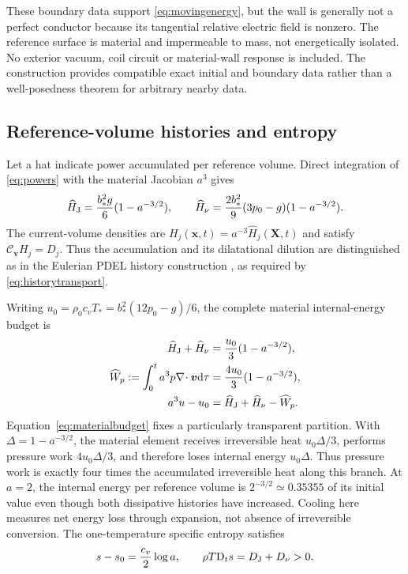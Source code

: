 \documentclass[11pt,a4paper]{article}
\theoremstyle{remark}\newtheorem{remark}{Remark}
\numberwithin{equation}{section}
\newcommand{\dd}{\mathrm{d}}
\newcommand{\vv}{\boldsymbol v}
\newcommand{\xx}{\boldsymbol x}
\newcommand{\XX}{\boldsymbol X}
\newcommand{\diver}{\nabla\!\cdot}
\newcommand{\Dt}{\mathrm D_t}
\newcommand{\Cv}{\mathcal C_{\vv}}
\begin{document}
These boundary data support \eqref{eq:movingenergy}, but the wall is generally not a perfect conductor because its tangential relative electric field is nonzero. The reference surface is material and impermeable to mass, not energetically isolated. No exterior vacuum, coil circuit or material-wall response is included. The construction provides compatible exact initial and boundary data rather than a well-posedness theorem for arbitrary nearby data.

\subsection{Reference-volume histories and entropy}
Let a hat indicate power accumulated per reference volume. Direct integration of \eqref{eq:powers} with the material Jacobian $a^3$ gives
\begin{equation}
\widehat H_{\rm J}=\frac{b_*^2g}{6}(1-a^{-3/2}),\qquad
\widehat H_\nu=\frac{2b_*^2}{9}(3p_0-g)(1-a^{-3/2}).
\label{eq:histories}
\end{equation}
The current-volume densities are $H_j(\xx,t)=a^{-3}\widehat H_j(\XX,t)$ and satisfy $\Cv H_j=D_j$. Thus the accumulation and its dilatational dilution are distinguished as in the Eulerian PDEL history construction \citep{RenEulerian}, as required by \eqref{eq:historytransport}.

Writing $u_0=\rho_0c_vT_*=b_*^2(12p_0-g)/6$, the complete material internal-energy budget is
\begin{equation}
\begin{aligned}
\widehat H_{\rm J}+\widehat H_\nu&=\frac{u_0}{3}(1-a^{-3/2}),\\
\widehat W_p:=\int_0^t a^3p\diver\vv\dd\tau
&=\frac{4u_0}{3}(1-a^{-3/2}),\\
a^3u-u_0&=\widehat H_{\rm J}+\widehat H_\nu-\widehat W_p.
\end{aligned}
\label{eq:materialbudget}
\end{equation}
Equation~\eqref{eq:materialbudget} fixes a particularly transparent partition. With $\Delta=1-a^{-3/2}$, the material element receives irreversible heat $u_0\Delta/3$, performs pressure work $4u_0\Delta/3$, and therefore loses internal energy $u_0\Delta$. Thus pressure work is exactly four times the accumulated irreversible heat along this branch. At $a=2$, the internal energy per reference volume is $2^{-3/2}\simeq0.35355$ of its initial value even though both dissipative histories have increased. Cooling here measures net energy loss through expansion, not absence of irreversible conversion. The one-temperature specific entropy satisfies
\begin{equation}
s-s_0=\frac{c_v}{2}\log a,\qquad
\rho T\Dt s=D_{\rm J}+D_\nu>0.
\label{eq:oneentropy}
\end{equation}
\end{document}
